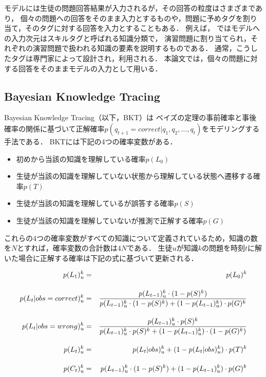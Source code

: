モデルには生徒の問題回答結果が入力されるが，その回答の粒度はさまざまであり，
個々の問題への回答をそのまま入力とするものや，問題に予めタグを割り当て，そのタグに対する回答を入力とすることもある．
例えば，
\cite{piech2015deep}ではモデルへの入力次元はスキルタグと呼ばれる知識分類で，
演習問題に割り当てられ，それぞれの演習問題で扱われる知識の要素を説明するものである．
通常，こうしたタグは専門家によって設計され，利用される．
本論文では，個々の問題に対する回答をそのままモデルの入力として用いる．


\subsection{Bayesian Knowledge Tracing}
Bayesian Knowledge Tracing\cite{corbett1994knowledge}（以下，BKT）は
ベイズの定理の事前確率と事後確率の関係に基づいて正解確率$p(q_{t+1} = correct|q_1, q_2, \dots, q_t)$をモデリングする手法である．
BKTには下記の4つの確率変数がある．
\begin{itemize}
\item 初めから当該の知識を理解している確率$p(L_0)$
\item 生徒が当該の知識を理解していない状態から理解している状態へ遷移する確率$p(T)$
\item 生徒が当該の知識を理解しているが誤答する確率$p(S)$
\item 生徒が当該の知識を理解していないが推測で正解する確率$p(G)$
\end{itemize}
これらの4つの確率変数がすべての知識について定義されているため，知識の数を$N$とすれば，確率変数の合計数は$4N$である．
生徒$u$が知識$k$の問題を時刻$t$に解いた場合に正解する確率は下記の式に基づいて更新される．

\hspace*{-55pt}
\begin{eqnarray}
\label{eq:bkt_update1}
p(L_1)^{k}_{u} &=& p(L_0)^k \\[\eqnsp]
\label{eq:bkt_update2}
p(L_{t}|obs=correct)^{k}_{u} &=& \frac{ p(L_{t-1})^{k}_{u} \cdot (1 - p(S)^k) }{ p(L_{t-1})^{k}_{u} \cdot (1 - p(S)^k) + (1 - p(L_{t-1})^{k}_{u}) \cdot p(G)^k } \\[\eqnsp]
\label{eq:bkt_update3}
p(L_{t}|obs=wrong)^{k}_{u} &=& \frac{ p(L_{t-1})^{k}_{u} \cdot p(S)^k }{ p(L_{t-1})^{k}_{u} \cdot p(S)^k + (1 - p(L_{t-1})^{k}_{u}) \cdot (1 - p(G)^k) } \\[\eqnsp]
\label{eq:bkt_update4}
p(L_{t})^{k}_{u} &=& p(L_{t}|obs)^{k}_{u} + (1 - p(L_{t}|obs)^{k}_{u}) \cdot p(T)^k  \\[\eqnsp]
\label{eq:bkt_update5}
p(C_{t})^{k}_{u} &=& p(L_{t-1})^{k}_{u} \cdot (1 - p(S)^k) + (1 - p(L_{t-1})^k_{u}) \cdot p(G)^k
\end{eqnarray}
\endminipage\hfill
\vvspace
\vvspace


